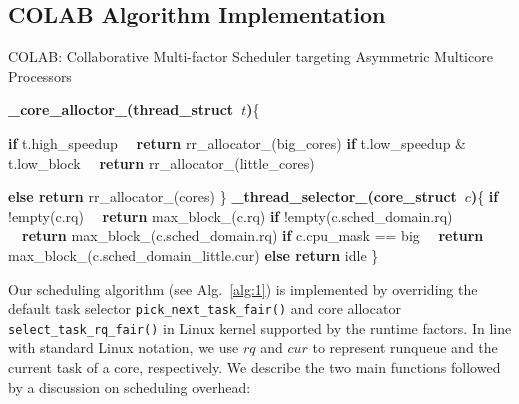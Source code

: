 \subsection{COLAB Algorithm Implementation}
\begin{algorithm}
\caption{COLAB: Collaborative Multi-factor Scheduler targeting Asymmetric Multicore Processors}
\label{alg:1}
\begin{algorithmic}[]
\STATE \textbf{\_core\_alloctor\_(thread\_struct\ $t$)}\{

\STATE \textbf{if} t.high\_speedup
\STATE \ \ \textbf{return} rr\_allocator\_(big\_cores)
\STATE \textbf{if} {t.low\_speedup \& t.low\_block}
\STATE \ \ \textbf{return} rr\_allocator\_(little\_cores)

\STATE \textbf{else return} rr\_allocator\_(cores) \}
\STATE
\STATE \textbf{\_thread\_selector\_(core\_struct\ $c$)}\{
\STATE \textbf{if}  !empty(c.rq)
\STATE \ \ \textbf{return} max\_block\_(c.rq)
\STATE \textbf{if} !empty(c.sched\_domain.rq)
\STATE \ \ \textbf{return} max\_block\_(c.sched\_domain.rq)
\STATE \textbf{if} c.cpu\_mask == big
\STATE \ \ \textbf{return}  max\_block\_(c.sched\_domain\_little.cur)
\STATE \textbf{else return} idle \}
\end{algorithmic}
\end{algorithm}

\noindent
Our scheduling algorithm (see Alg.~\ref{alg:1}) is implemented by overriding the default task selector \texttt{pick\_next\_task\_fair()} and core allocator \texttt{select\_task\_rq\_fair()} in Linux kernel supported by the runtime factors. %
In line with standard Linux notation, we use $rq$ and $cur$ to represent runqueue and the current task of a core, respectively. We describe the two main functions followed by a discussion on scheduling overhead:

